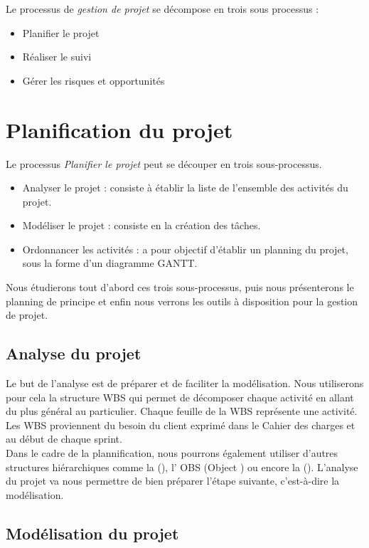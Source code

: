 Le processus de \textit{gestion de projet} se décompose en trois sous processus : 
\begin{itemize}
\item Planifier le projet
\item Réaliser le suivi
\item Gérer les risques et opportunités
\end{itemize}

\section{Planification du projet}
\label{planification}

Le processus \textit{Planifier le projet} peut se découper en trois sous-processus.

\begin{itemize}
\item Analyser le projet : consiste à établir la liste de l'ensemble des activités du projet.
\item Modéliser le projet : consiste en la création des tâches.
\item Ordonnancer les activités : a pour objectif d'établir un planning du projet, sous la forme d'un diagramme GANTT.
\end{itemize}

Nous étudierons tout d'abord ces trois sous-processus, puis nous présenterons le planning de principe et enfin nous verrons les outils à disposition pour la gestion de projet. 

\subsection{Analyse du projet}
\label{analyse}
Le but de l'analyse est de préparer et de faciliter la modélisation. Nous utiliserons pour cela la structure WBS qui permet de décomposer chaque activité en allant du plus général au particulier. Chaque feuille de la WBS représente une activité. Les WBS proviennent du besoin du client exprimé dans le Cahier des charges et au début de chaque sprint. \\

Dans le cadre de la plannification, nous pourrons également utiliser d’autres structures hiérarchiques comme la \FBSCourt (\FBS), l’ OBS (Object \BS) ou encore la \RBSCourt (\RBS). L’analyse du projet va nous permettre de bien préparer l’étape suivante, c’est-à-dire la modélisation.


\subsection{Modélisation du projet}
\label{modelisation}

